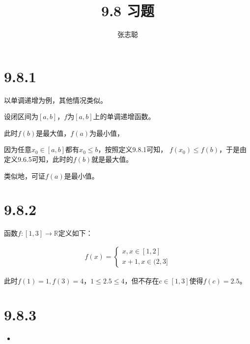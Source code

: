 \documentclass{article}
\begin{document}
\title{9.8 习题}
\author{张志聪}
\maketitle

\section*{9.8.1}

以单调递增为例，其他情况类似。

设闭区间为$[a, b]$，$f$为$[a, b]$上的单调递增函数。

此时$f(b)$是最大值，$f(a)$为最小值，

因为任意$x_0 \in [a, b]$都有$x_0 \leq b$，按照定义9.8.1可知，
$f(x_0) \leq f(b)$，于是由定义9.6.5可知，此时的$f(b)$就是最大值。

类似地，可证$f(a)$是最小值。

\section*{9.8.2}

函数$f: [1, 3] \to \mathbb{R}$定义如下：

\begin{eqnarray*}
  f(x) =
  \begin{cases*}
    x, x \in [1, 2] \\
    x+1, x \in (2,3]
  \end{cases*}
\end{eqnarray*}

此时$f(1) = 1, f(3) = 4$，$1 \leq 2.5 \leq 4$，但不存在$c \in [1, 3]$使得$f(c) = 2.5$。

\section*{9.8.3}

\begin{itemize}
  \item 
\end{itemize}
\end{document}
